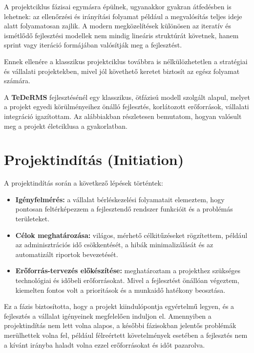 A projektciklus fázisai egymásra épülnek, ugyanakkor gyakran átfedésben is lehetnek: 
az ellenőrzési és irányítási folyamat például a megvalósítás teljes ideje alatt folyamatosan zajlik.  
A modern megközelítések különösen az iteratív és ismétlődő fejlesztési modellek nem mindig lineáris struktúrát követnek, 
hanem sprint vagy iteráció formájában valósítják meg a fejlesztést.  

Ennek ellenére a klasszikus projektciklus továbbra is nélkülözhetetlen a stratégiai és vállalati projektekben, 
mivel jól követhető keretet biztosít az egész folyamat számára.  

A \textbf{TeDeRMS} fejlesztésénél egy klasszikus, ötfázisú modell szolgált alapul, 
melyet a projekt egyedi körülményeihez önálló fejlesztés, korlátozott erőforrások, vállalati integráció igazítottam.  
Az alábbiakban részletesen bemutatom, hogyan valósult meg a projekt életciklusa a gyakorlatban.


\section{Projektindítás (Initiation)}

A projektindítás során a következő lépések történtek:
\begin{itemize}
    \item \textbf{Igényfelmérés:} a vállalat bérléskezelési folyamatait elemeztem, hogy pontosan feltérképezzem a fejlesztendő rendszer funkcióit és a problémás területeket.
    \item \textbf{Célok meghatározása:} világos, mérhető célkitűzéseket rögzítettem, például az adminisztrációs idő csökkentését, a hibák minimalizálását és az automatizált riportok bevezetését.
    \item \textbf{Erőforrás-tervezés előkészítése:} meghatároztam a projekthez szükséges technológiai és időbeli erőforrásokat. 
    Mivel a fejlesztést önállóan végeztem, kiemelten fontos volt a prioritások és a munkaidő hatékony beosztása.
\end{itemize}

Ez a fázis biztosította, hogy a projekt kiindulópontja egyértelmű legyen, és a fejlesztés a vállalat igényeinek megfelelően induljon el.
Amennyiben a projektindítás nem lett volna alapos, a későbbi fázisokban jelentős problémák merülhettek volna fel, 
például félreértett követelmények esetében a fejlesztés nem a kívánt irányba haladt volna ezzel erőforrásokat és időt pazarolva.

